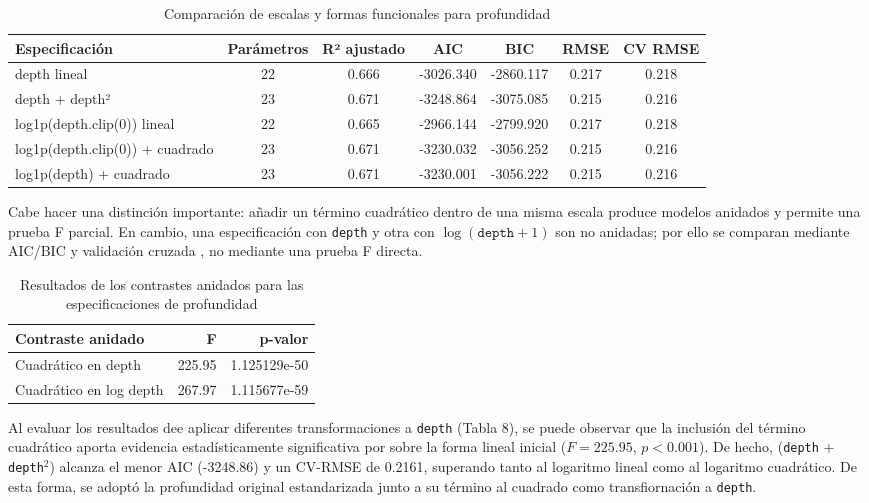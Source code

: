 \documentclass{style}
\newcommand{\var}[1]{\texttt{#1}}
\begin{document}
\begin{table}[H]
    \centering
    \caption{Comparación de escalas y formas funcionales para profundidad}
    \scriptsize
    \setlength{\tabcolsep}{9pt} 
    \begin{tabular}{lcccccc}
    \toprule
    \textbf{Especificación} & \textbf{Parámetros} & \textbf{R² ajustado} & \textbf{AIC} & \textbf{BIC} & \textbf{RMSE} & \textbf{CV RMSE} \\
    \midrule
    depth lineal & 22 & 0.666 & -3026.340 & -2860.117 & 0.217 & 0.218 \\
    depth + depth² & 23 & 0.671 & -3248.864 & -3075.085 & 0.215 & 0.216 \\
    log1p(depth.clip(0)) lineal & 22 & 0.665 & -2966.144 & -2799.920 & 0.217 & 0.218 \\
    log1p(depth.clip(0)) + cuadrado & 23 & 0.671 & -3230.032 & -3056.252 & 0.215 & 0.216 \\
    log1p(depth) + cuadrado & 23 & 0.671 & -3230.001 & -3056.222 & 0.215 & 0.216 \\
    \bottomrule
    \end{tabular}
\end{table}

Cabe hacer una distinción importante: añadir un término cuadrático dentro de una misma escala produce modelos anidados y permite una prueba F parcial. En cambio, una especificación con \var{depth} y otra con $\log(\var{depth}+1)$ son no anidadas; por ello se comparan mediante AIC/BIC \cite{akaike1974,schwarz1978} y validación cruzada \cite{stone1974}, no mediante una prueba F directa.


\begin{table}[H]
    \centering
    \caption{Resultados de los contrastes anidados para las especificaciones de profundidad}
    \scriptsize
    \setlength{\tabcolsep}{12pt} 
    \begin{tabular}{lrr}
    \toprule
    \textbf{Contraste anidado} & \textbf{F} & \textbf{p-valor} \\
    \midrule
    Cuadrático en depth & 225.95 & 1.125129e-50 \\
    Cuadrático en log depth & 267.97 & 1.115677e-59 \\
    \bottomrule
    \end{tabular}
\end{table}



Al evaluar los resultados dee aplicar diferentes transformaciones a \var{depth} (Tabla 8), se puede observar que la inclusión del término cuadrático aporta evidencia estadísticamente significativa por sobre la forma lineal inicial ($F = 225.95$, $p < 0.001$). De hecho, (\texttt{depth} + \texttt{depth}$^2$) alcanza el menor AIC (-3248.86) y un CV-RMSE de 0.2161, superando tanto al logaritmo lineal como al logaritmo cuadrático. De esta forma, se adoptó la profundidad original estandarizada junto a su término al cuadrado como transfiornación a \var{depth}. 
\end{document}
